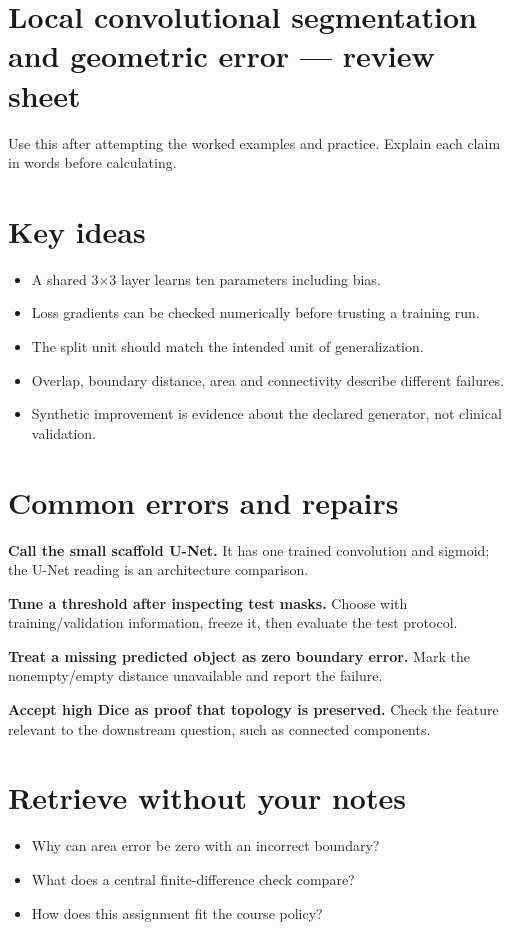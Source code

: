 \documentclass[11pt,letterpaper]{article}
\theoremstyle{definition}\newtheorem{definition}{Definition}\newtheorem{example}{Example}
\numberwithin{equation}{section}
\begin{document}
\section*{Local convolutional segmentation and geometric error --- review sheet}
Use this after attempting the worked examples and practice. Explain each claim in words before calculating.

\section*{Key ideas}
\begin{itemize}
\item A shared 3$\times$3 layer learns ten parameters including bias.
\item Loss gradients can be checked numerically before trusting a training run.
\item The split unit should match the intended unit of generalization.
\item Overlap, boundary distance, area and connectivity describe different failures.
\item Synthetic improvement is evidence about the declared generator, not clinical validation.
\end{itemize}
\section*{Common errors and repairs}
\textbf{Call the small scaffold U-Net.} It has one trained convolution and sigmoid; the U-Net reading is an architecture comparison.

\textbf{Tune a threshold after inspecting test masks.} Choose with training/validation information, freeze it, then evaluate the test protocol.

\textbf{Treat a missing predicted object as zero boundary error.} Mark the nonempty/empty distance unavailable and report the failure.

\textbf{Accept high Dice as proof that topology is preserved.} Check the feature relevant to the downstream question, such as connected components.

\section*{Retrieve without your notes}
\begin{itemize}
\item Why can area error be zero with an incorrect boundary?
\item What does a central finite-difference check compare?
\item How does this assignment fit the course policy?
\end{itemize}
\end{document}
